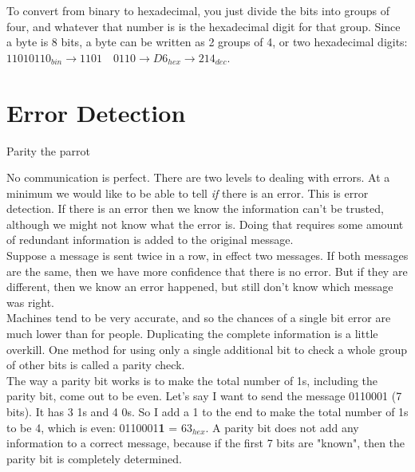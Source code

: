 To convert from binary to hexadecimal, you just divide the bits into groups of four, and whatever that number is is the hexadecimal digit for that group. Since a byte is 8 bits, a byte can be written as 2 groups of 4, or two hexadecimal digits: \(11010110_{bin} \rightarrow 1101\quad0110 \rightarrow D6_{hex} \rightarrow 214_{dec}\).

\section{Error Detection}


\epigraph{}{Parity the parrot}

No communication is perfect. There are two levels to dealing with errors. At a minimum we would like to be able to tell \textit{if} there is an error. This is error detection. If there is an error then we know the information can't be trusted, although we might not know what the error is. Doing that requires some amount of redundant information is added to the original message.\\

Suppose a message is sent twice in a row, in effect two messages. If both messages are the same, then we have more confidence that there is no error. But if they are different, then we know an error happened, but still don't know which message was right.\\

Machines tend to be very accurate, and so the chances of a single bit error are much lower than for people. Duplicating the complete information is a little overkill. One method for using only a single additional bit to check a whole group of other bits is called a parity check.\\

The way a parity bit works is to make the total number of 1s, including the parity bit, come out to be even. Let's say I want to send the message 0110001 (7 bits). It has 3 1s and 4 0s. So I add a 1 to the end to make the total number of 1s to be 4, which is even: 0110001\textbf{1} = 63\(_{hex}\). A parity bit does not add any information to a correct message, because if the first 7 bits are "known", then the parity bit is completely determined.\\

\begin{center}\end{center}

